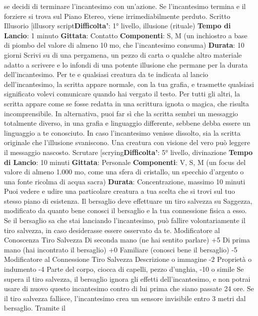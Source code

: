 \begin{multicols}{2}
se decidi di terminare l’incantesimo con un’azione. Se
l’incantesimo termina e il forziere si trova sul Piano
Etereo, viene irrimediabilmente perduto.
Scritto Illusorio
[illusory script\textbf{Difficolta'}:
1° livello, illusione (rituale)
\textbf{Tempo di Lancio}: 1 minuto
\textbf{Gittata}: Contatto
\textbf{Componenti}: S, M (un inchiostro a base di piombo del
valore di almeno 10 mo, che l’incantesimo consuma)
\textbf{Durata}: 10 giorni
Scrivi su di una pergamena, un pezzo di carta o
qualche altro materiale adatto a scrivere e lo infondi di
una potente illusione che permane per la durata
dell’incantesimo.
Per te e qualsiasi creatura da te indicata al lancio
dell’incantesimo, la scritta appare normale, con la tua
grafia, e trasmette qualsiasi significato volevi
comunicare quando hai vergato il testo. Per tutti gli altri,
la scritta appare come se fosse redatta in una scrittura
ignota o magica, che risulta incomprensibile. In
alternativa, puoi far sì che la scritta sembri un
messaggio totalmente diverso, in una grafia e
linguaggio differente, sebbene debba essere un
linguaggio a te conosciuto.
In caso l’incantesimo venisse dissolto, sia la scritta
originale che l’illusione svaniscono.
Una creatura con visione del vero può leggere il
messaggio nascosto.
Scrutare
[scrying\textbf{Difficolta'}:
5° livello, divinazione
\textbf{Tempo di Lancio}: 10 minuti
\textbf{Gittata}: Personale
\textbf{Componenti}: V, S, M (un focus del valore di almeno
1.000 mo, come una sfera di cristallo, un specchio
d’argento o una fonte ricolma di acqua sacra)
\textbf{Durata}: Concentrazione, massimo 10 minuti
Puoi vedere e udire una particolare creatura a tua
scelta che si trovi sul tuo stesso piano di esistenza. Il
bersaglio deve effettuare un tiro salvezza su Saggezza,
modificato da quanto bene conosci il bersaglio e la tua
connessione fisica a esso. Se il bersaglio sa che stai
lanciando l’incantesimo, può fallire volontariamente il
tiro salvezza, in caso desiderasse essere osservato da
te.
Modificatore al
Conoscenza Tiro Salvezza
Di seconda mano (ne hai sentito parlare) +5
Di prima mano (hai incontrato il bersaglio) +0
Familiare (conosci bene il bersaglio) -5
Modificatore al
Connessione Tiro Salvezza
Descrizione o immagine -2
Proprietà o indumento -4
Parte del corpo, ciocca di capelli, pezzo d’unghia, -10
o simile
Se supera il tiro salvezza, il bersaglio ignora gli effetti
dell’incantesimo, e non potrai usare di nuovo questo
incantesimo contro di lui prima che siano passate 24
ore.
Se il tiro salvezza fallisce, l’incantesimo crea un
sensore invisibile entro 3 metri dal bersaglio. Tramite il

\end{multicols}
